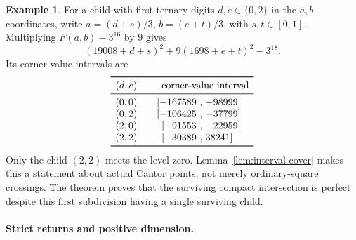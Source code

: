 \documentclass[11pt,a4paper]{amsart}
\numberwithin{equation}{section}
\theoremstyle{definition}
\newtheorem{example}[theorem]{Example}
\begin{document}
\begin{example}\label{ex:first-subdivision}
For a child with first ternary digits \(d,e\in\{0,2\}\) in the
\(a,b\) coordinates, write
\(a=(d+s)/3\), \(b=(e+t)/3\), with \(s,t\in[0,1]\).
Multiplying \(F(a,b)-3^{16}\) by \(9\) gives
\[
(19008+d+s)^2+9(1698+e+t)^2-3^{18}.
\]
Its corner-value intervals are
\[
\begin{array}{c@{\qquad}r@{\ ,\ }l}
\toprule
(d,e)&\multicolumn{2}{c}{\text{corner-value interval}}\\
\midrule
(0,0)&[-167589&-98999]\\
(0,2)&[-106425&-37799]\\
(2,0)&[-91553&-22959]\\
(2,2)&[-30389&38241]\\
\bottomrule
\end{array}
\]
Only the child \((2,2)\) meets the level zero.
Lemma~\ref{lem:interval-cover} makes this a statement about actual
Cantor points, not merely ordinary-square crossings.
The theorem proves that the surviving compact intersection is
perfect despite this first subdivision having a single surviving
child.
\end{example}



\paragraph{Strict returns and positive dimension.}
\end{document}
